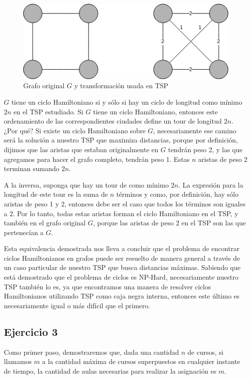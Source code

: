\documentclass{article}
\begin{document}
\begin{figure}[H]
    \centering
    \includegraphics[scale=0.7]{res/tsp.png} 
    \caption{Grafo original $G$ y transformación usada en TSP}
\end{figure}
$G$ tiene un ciclo Hamiltoniano si y sólo si hay un ciclo de longitud como mínimo $2n$ en el TSP estudiado. Si $G$ tiene un ciclo Hamiltoniano, entonces este ordenamiento de las correspondientes ciudades define un tour de longitud $2n$. ¿Por qué? Si existe un ciclo Hamiltoniano sobre $G$, necesariamente ese camino será la solución a nuestro TSP que maximiza distancias, porque por definición, dijimos que las aristas que estaban originalmente en $G$ tendrán peso 2, y las que agregamos para hacer el grafo completo, tendrán peso 1. Estas $n$ aristas de peso $2$ terminan sumando $2n$.

A la inversa, suponga que hay un tour de como mínimo $2n$. La expresión para la longitud de este tour es la suma de $n$ términos y como, por definición, hay sólo aristas de peso 1 y 2, entonces debe ser el caso que todos los términos son iguales a $2$. Por lo tanto, todas estas aristas forman el ciclo Hamiltoniano en el TSP, y también en el grafo original $G$, porque las aristas de peso $2$ en el TSP son las que pertenecían a $G$.

Esta equivalencia demostrada nos lleva a concluir que el problema de encontrar ciclos Hamiltonianos en grafos puede ser resuelto de manera general a través de un caso particular de nuestro TSP que busca distancias máximas. Sabiendo que está demostrado que el problema de ciclos es NP-Hard, necesariamente nuestro TSP también lo es, ya que encontramos una manera de resolver ciclos Hamiltonianos utilizando TSP como caja negra interna, entonces este último es necesariamente igual o más difícil que el primero.

\subsection{Ejercicio 3}
Como primer paso, demostraremos que, dada una cantidad $n$ de cursos, si llamamos $m$ a la cantidad máxima de cursos superpuestos en cualquier instante de tiempo, la cantidad de aulas necesarias para realizar la asignación es $m$.\\
\end{document}
